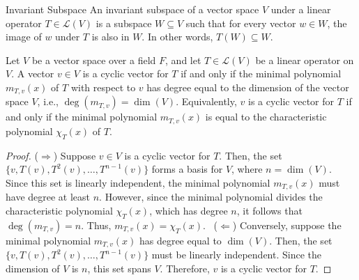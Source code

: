 \documentclass[openany]{book}
\begin{document}
\begin{mydefinition}{Invariant Subspace}
An invariant subspace of a vector space $V$ under a linear operator $T \in \mathcal{L}(V)$ is a subspace $W \subseteq V$ such that for every vector $w \in W$, the image of $w$ under $T$ is also in $W$. In other words, $T(W) \subseteq W$.
\end{mydefinition}
\begin{mytheorem}
Let $V$ be a vector space over a field $F$, and let $T \in \mathcal{L}(V)$ be a linear operator on $V$. A vector $v \in V$ is a cyclic vector for $T$ if and only if the minimal polynomial $m_{T,v}(x)$ of $T$ with respect to $v$ has degree equal to the dimension of the vector space $V$, i.e., $\deg(m_{T,v}) = \dim(V)$. Equivalently, $v$ is a cyclic vector for $T$ if and only if the minimal polynomial $m_{T,v}(x)$ is equal to the characteristic polynomial $\chi_T(x)$ of $T$.
\end{mytheorem}
\begin{proof}
($\Rightarrow$) Suppose $v \in V$ is a cyclic vector for $T$. Then, the set $\{v, T(v), T^2(v), \ldots, T^{n-1}(v)\}$ forms a basis for $V$, where $n = \dim(V)$. Since this set is linearly independent, the minimal polynomial $m_{T,v}(x)$ must have degree at least $n$. However, since the minimal polynomial divides the characteristic polynomial $\chi_T(x)$, which has degree $n$, it follows that $\deg(m_{T,v}) = n$. Thus, $m_{T,v}(x) = \chi_T(x)$. \
($\Leftarrow$) Conversely, suppose the minimal polynomial $m_{T,v}(x)$ has degree equal to $\dim(V)$. Then, the set $\{v, T(v), T^2(v), \ldots, T^{n-1}(v)\}$ must be linearly independent. Since the dimension of $V$ is $n$, this set spans $V$. Therefore, $v$ is a cyclic vector for $T$.
\end{proof}
\end{document}
